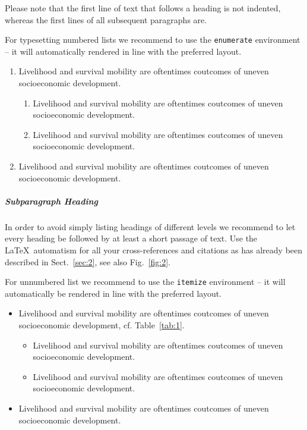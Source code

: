 \documentclass[graybox]{svmult}
\begin{document}
Please note that the first line of text that follows a heading is not indented, whereas the first lines of all subsequent paragraphs are.

For typesetting numbered lists we recommend to use the \verb|enumerate| environment -- it will automatically rendered in line with the preferred layout.

\begin{enumerate}
\item{Livelihood and survival mobility are oftentimes coutcomes of uneven socioeconomic development.}
\begin{enumerate}
\item{Livelihood and survival mobility are oftentimes coutcomes of uneven socioeconomic development.}
\item{Livelihood and survival mobility are oftentimes coutcomes of uneven socioeconomic development.}
\end{enumerate}
\item{Livelihood and survival mobility are oftentimes coutcomes of uneven socioeconomic development.}
\end{enumerate}


\subparagraph{Subparagraph Heading} In order to avoid simply listing headings of different levels we recommend to let every heading be followed by at least a short passage of text. Use the \LaTeX\ automatism for all your cross-references and citations as has already been described in Sect.~\ref{sec:2}, see also Fig.~\ref{fig:2}.

For unnumbered list we recommend to use the \verb|itemize| environment -- it will automatically be rendered in line with the preferred layout.

\begin{itemize}
\item{Livelihood and survival mobility are oftentimes coutcomes of uneven socioeconomic development, cf. Table~\ref{tab:1}.}
\begin{itemize}
\item{Livelihood and survival mobility are oftentimes coutcomes of uneven socioeconomic development.}
\item{Livelihood and survival mobility are oftentimes coutcomes of uneven socioeconomic development.}
\end{itemize}
\item{Livelihood and survival mobility are oftentimes coutcomes of uneven socioeconomic development.}
\end{itemize}
\end{document}
